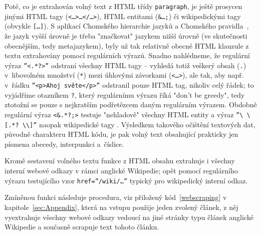 Poté, co je extrahován volný text z HTML třídy \texttt{paragraph}, je
ještě prosycen jinými HTML tagy (\texttt{<\ldots>\ldots</\ldots>}),
HTML entitami (\texttt{\&\ldots;}) či wikipedickými tagy%
 (obvykle
\texttt{[\ldots]}). S aplikací Chomského hierarchie jazyků%
 a Chomského
pravidla~\cite{Chomsky1956}, že jazyk vyšší úrovně je třeba "značkovat"
jazykem nižší úrovně (ve skutečnosti obecnějším, tedy metajazykem), byly už
tak relativně obecné HTML klauzule z textu extrahovány pomocí regulárních
výrazů. Snadno nahlédneme, že regulární výraz \texttt{''<.*?>''} odstraní
všechny HTML tagy -- vyhledá totiž veškerý obsah (\texttt{.}) v~libovolném
množství (\texttt{*}) mezi úhlovými závorkami (\texttt{<\ldots>}), ale tak,
aby např. v~řádku \texttt{''<p>Ahoj světe</p>''} odstranil pouze HTML tag,
nikoliv celý řádek; to vyjádříme otazníkem \texttt{?}, který regulárnímu výrazu
říká "don't be greedy", tedy ztotožní se pouze s nejkratším podřetězcem daným
regulárním výrazem. Obdobně regulární výraz \texttt{<\&.*?;>} testuje
"nehladově" všechny HTML entity a výraz \texttt{''\textbackslash
\textbackslash [.*? \textbackslash \textbackslash ]''} naopak wikipedické tagy%
.
Výsledkem takového očištění textových dat, původně charakteru HTML kódu,
je pak volný text obsahující prakticky jen písmena abecedy, interpunkci
a~číslice.

Kromě sestavení volného textu funkce z HTML obsahu extrahuje i všechny
interní webové odkazy v rámci anglické Wikipedie;
opět pomocí regulárního
výrazu testujícího vzor \texttt{href=''/wiki/\ldots''} typický pro
wikipedický interní odkaz.

Zmíněnou funkci následuje procedura, viz přiložený kód~\ref{webscraping}
v kapitole~\ref{sec:Appendix},
která na vstupu použije jeden zvolený
článek, z něj vyextrahuje všechny webové odkazy vedoucí na jiné
stránky typu článek anglické Wikipedie a současně scrapuje%
 text tohoto článku.

